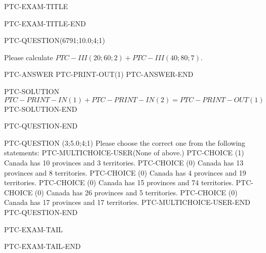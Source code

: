 \documentclass[12pt]{article}
\begin{document}
PTC-EXAM-TITLE




PTC-EXAM-TITLE-END



PTC-QUESTION(6791;10.0;4;1)

Please calculate $PTC-III (20; 60; 2) + PTC-III (40; 80; 7) $. 

PTC-ANSWER
   PTC-PRINT-OUT(1)
PTC-ANSWER-END

PTC-SOLUTION
$PTC-PRINT-IN(1) + PTC-PRINT-IN(2)=  PTC-PRINT-OUT(1)$
PTC-SOLUTION-END

PTC-QUESTION-END



PTC-QUESTION  (3;5.0;4;1)
Please choose the correct one from the following statements:
PTC-MULTICHOICE-USER(None of above.)
   PTC-CHOICE (1) Canada has 10  provinces and 3 territories.
   PTC-CHOICE (0) Canada has  13 provinces and  8 territories.
   PTC-CHOICE (0) Canada has   4 provinces and  19 territories.
   PTC-CHOICE (0) Canada has  15 provinces and  74 territories.
   PTC-CHOICE (0) Canada has  26 provinces and  5 territories.
   PTC-CHOICE (0) Canada has  17 provinces and  17 territories.
PTC-MULTICHOICE-USER-END
PTC-QUESTION-END



PTC-EXAM-TAIL

PTC-EXAM-TAIL-END
\end{document}
